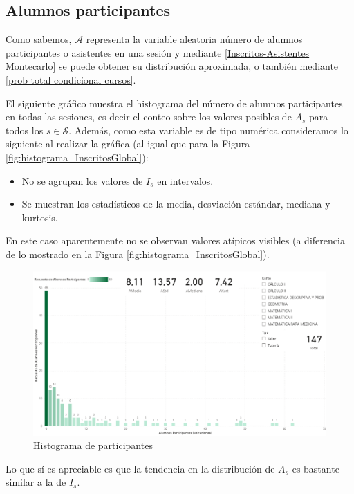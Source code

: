 \documentclass[11pt,a4paper]{book}
\theoremstyle{definition}%
\begin{document}
            \subsection{Alumnos participantes}
                Como sabemos, $\mathcal{A}$ representa la variable aleatoria número de alumnos participantes o asistentes en una sesión y mediante \ref{Inscritos-Asistentes Montecarlo} se puede obtener su distribución aproximada, o también mediante \ref{prob total condicional cursos}.
                
                El siguiente gráfico muestra el histograma del número de alumnos participantes en todas las sesiones, es decir el conteo sobre los valores posibles de $A_s$ para todos los $s\in\mathcal{S}$. Además, como esta variable es de tipo numérica consideramos lo siguiente al realizar la gráfica (al igual que para la Figura \ref{fig:histograma_InscritosGlobal}):
                \begin{itemize}
                    \item No se agrupan los valores de $I_s$ en intervalos.
                    \item Se muestran los estadísticos de la media, desviación estándar, mediana y kurtosis.
                \end{itemize}
                En este caso aparentemente no se observan valores atípicos visibles (a diferencia de lo mostrado en la Figura \ref{fig:histograma_InscritosGlobal}).
                \begin{figure}[H]
                    \centering
                    \includegraphics[width=1\textwidth]{Sources/histograma_ParticipantesGlobal.png}
                    \caption{Histograma de participantes}
                    \label{fig:histograma_ParticipantesGlobal}
                \end{figure}
                Lo que sí es apreciable es que la tendencia en la distribución de $A_s$ es bastante similar a la de $I_s$.
\end{document}
